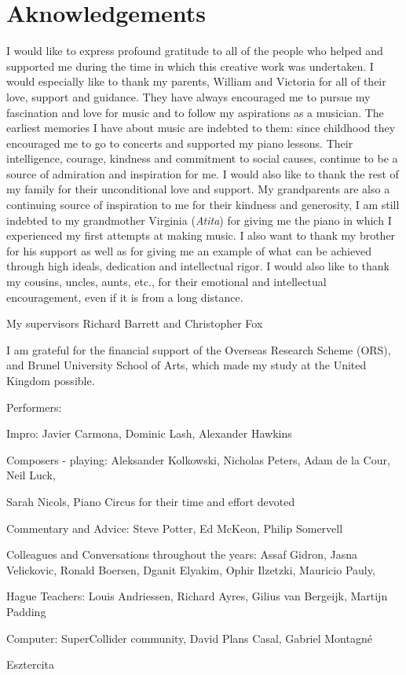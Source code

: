 \chapter*{Aknowledgements}

I would like to express profound gratitude to all of the people who helped and supported me during the time in which this creative work was undertaken. I would especially like to thank my parents, William and Victoria for all of their love, support and guidance. They have always encouraged me to pursue my fascination and love for music and to follow my aspirations as a musician. The earliest memories I have about music are indebted to them: since childhood they encouraged me to go to concerts and supported my piano lessons. Their intelligence, courage, kindness and commitment to social causes, continue to be a source of admiration and inspiration for me. I would also like to thank the rest of my family for their unconditional love and support. My grandparents are also a continuing source of inspiration to me for their kindness and generosity, I am still indebted to my grandmother Virginia (\emph{Atita}) for giving me the piano in which I experienced my first attempts at making music. I also want to thank my brother for his support as well as for giving me an example of what can be achieved through high ideals, dedication and intellectual rigor. I would also like to thank my cousins, uncles, aunts, etc., for their emotional and intellectual encouragement, even if it is from a long distance.

My supervisors Richard Barrett and Christopher Fox

I am grateful for the financial support of the Overseas Research Scheme (ORS), and Brunel University School of Arts, which made my study at the United Kingdom possible.


Performers: 

Impro: Javier Carmona, Dominic Lash, Alexander Hawkins

Composers - playing: Aleksander Kolkowski, Nicholas Peters, Adam de la Cour, Neil Luck, 

Sarah Nicols, Piano Circus for their time and effort devoted

Commentary and Advice: Steve Potter, Ed McKeon, Philip Somervell

Colleagues and Conversations throughout the years:  Assaf Gidron, Jasna Velickovic, Ronald Boersen, Dganit Elyakim, Ophir Ilzetzki, Mauricio Pauly, 

Hague Teachers: Louis Andriessen, Richard Ayres, Gilius van Bergeijk, Martijn Padding

Computer: SuperCollider community, David Plans Casal, Gabriel Montagn\'e

Esztercita
